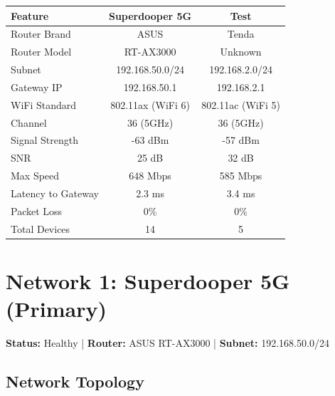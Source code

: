 \documentclass[11pt,letterpaper]{article}
\begin{document}
\begin{center}
\begin{tabular}{lcc}
\toprule
\textbf{Feature} & \textbf{Superdooper 5G} & \textbf{Test} \\
\midrule
Router Brand & ASUS & Tenda \\
Router Model & RT-AX3000 & Unknown \\
Subnet & 192.168.50.0/24 & 192.168.2.0/24 \\
Gateway IP & 192.168.50.1 & 192.168.2.1 \\
WiFi Standard & 802.11ax (WiFi 6) & 802.11ac (WiFi 5) \\
Channel & 36 (5GHz) & 36 (5GHz) \\
Signal Strength & -63 dBm & -57 dBm \\
SNR & 25 dB & 32 dB \\
Max Speed & 648 Mbps & 585 Mbps \\
Latency to Gateway & 2.3 ms & 3.4 ms \\
Packet Loss & 0\% & 0\% \\
Total Devices & 14 & 5 \\
\bottomrule
\end{tabular}
\end{center}

\section{Network 1: Superdooper 5G (Primary)}

\begin{tcolorbox}[colback=asuscolor!5,colframe=asuscolor,title=Superdooper 5G Network Summary]
\textbf{Status:} \textcolor{goodcolor}{Healthy} | \textbf{Router:} ASUS RT-AX3000 | \textbf{Subnet:} 192.168.50.0/24
\end{tcolorbox}

\subsection{Network Topology}
\end{document}
